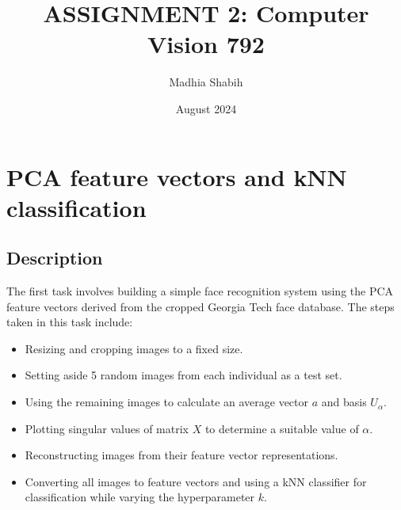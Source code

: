 \documentclass{article}
\title{ASSIGNMENT 2: Computer Vision 792}
\author{Madhia Shabih}
\date{August 2024}
\begin{document}
\maketitle

\section{PCA feature vectors and kNN classification}
\subsection{Description}  
   The first task involves building a simple face recognition system using the PCA feature vectors derived from the cropped Georgia Tech face database. 
   The steps taken in this task include:
   \begin{itemize}
       \item Resizing and cropping images to a fixed size.
       \item Setting aside 5 random images from each individual as a test set.
       \item Using the remaining images to calculate an average vector \( a \) and basis \( U_\alpha \).
       \item Plotting singular values of matrix \( X \) to determine a suitable value of \( \alpha \).
       \item Reconstructing images from their feature vector representations.
       \item Converting all images to feature vectors and using a kNN classifier for classification while varying the hyperparameter \( k \).
   \end{itemize}
\end{document}
